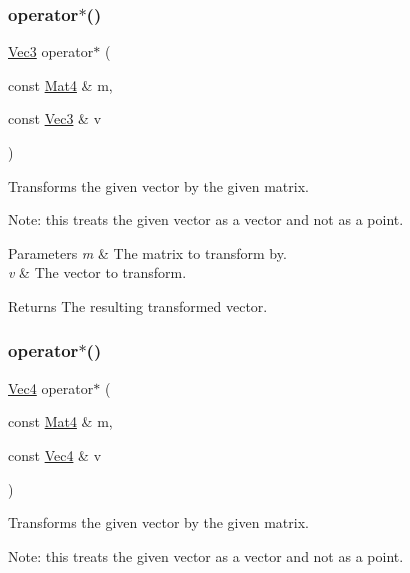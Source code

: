 \subsubsection{\texorpdfstring{operator$\ast$()}{operator*()}\hspace{0.1cm}{\footnotesize\ttfamily [4/5]}}
{\footnotesize\ttfamily \hyperlink{classVec3}{Vec3} operator$\ast$ (\begin{DoxyParamCaption}\item[{const \hyperlink{classMat4}{Mat4} \&}]{m,  }\item[{const \hyperlink{classVec3}{Vec3} \&}]{v }\end{DoxyParamCaption})\hspace{0.3cm}{\ttfamily [inline]}}

Transforms the given vector by the given matrix.

Note\+: this treats the given vector as a vector and not as a point.


\begin{DoxyParams}{Parameters}
{\em m} & The matrix to transform by. \\
\hline
{\em v} & The vector to transform. \\
\hline
\end{DoxyParams}
\begin{DoxyReturn}{Returns}
The resulting transformed vector. 
\end{DoxyReturn}
\mbox{\label{group__base_gae9acea19f23ab35cac4e98bffeb897c4}} 
\subsubsection{\texorpdfstring{operator$\ast$()}{operator*()}\hspace{0.1cm}{\footnotesize\ttfamily [5/5]}}
{\footnotesize\ttfamily \hyperlink{classVec4}{Vec4} operator$\ast$ (\begin{DoxyParamCaption}\item[{const \hyperlink{classMat4}{Mat4} \&}]{m,  }\item[{const \hyperlink{classVec4}{Vec4} \&}]{v }\end{DoxyParamCaption})\hspace{0.3cm}{\ttfamily [inline]}}

Transforms the given vector by the given matrix.

Note\+: this treats the given vector as a vector and not as a point.


